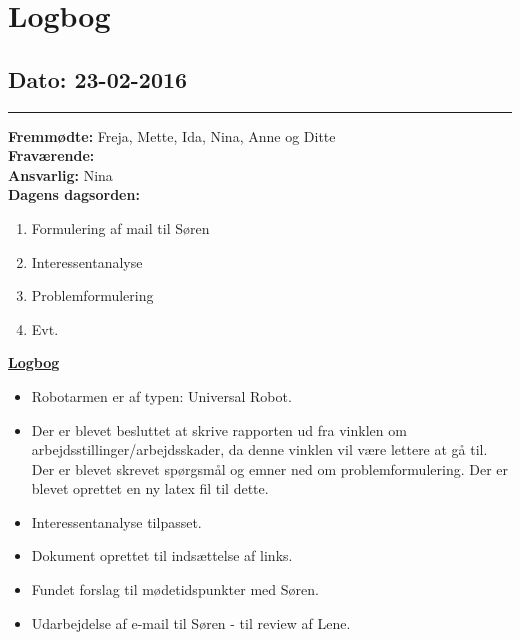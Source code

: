 \chapter{Logbog}
\section{Dato: 23-02-2016}
\hrule
\textbf{Fremmødte:} Freja, Mette, Ida, Nina, Anne og Ditte \\
\textbf{Fraværende: } \\
\textbf{Ansvarlig:} Nina  \\
\textbf{Dagens dagsorden: }
\begin{enumerate}
	\item Formulering af mail til Søren
	\item Interessentanalyse
	\item Problemformulering
	\item Evt. 
\end{enumerate}

\underline{\textbf{Logbog}}
\begin{itemize}
	\item Robotarmen er af typen: Universal Robot.
	\item Der er blevet besluttet at skrive rapporten ud fra vinklen om arbejdsstillinger/arbejdsskader, da denne vinklen vil være lettere at gå til. Der er blevet skrevet spørgsmål og emner ned om problemformulering. Der er blevet oprettet en ny latex fil til dette. 
	\item Interessentanalyse tilpasset. 
	\item Dokument oprettet til indsættelse af links.
	\item Fundet forslag til mødetidspunkter med Søren. 
	\item Udarbejdelse af e-mail til Søren - til review af Lene.
\end{itemize}

\newpage